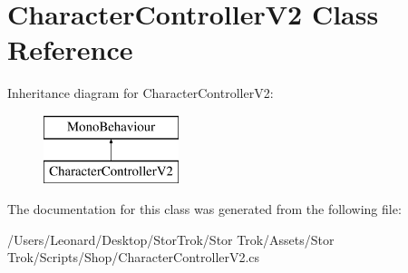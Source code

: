 \hypertarget{class_character_controller_v2}{}\section{Character\+Controller\+V2 Class Reference}
\label{class_character_controller_v2}
Inheritance diagram for Character\+Controller\+V2\+:\begin{figure}[H]
\begin{center}
\leavevmode
\includegraphics[height=2.000000cm]{class_character_controller_v2}
\end{center}
\end{figure}


The documentation for this class was generated from the following file\+:\begin{DoxyCompactItemize}
\item 
/\+Users/\+Leonard/\+Desktop/\+Stor\+Trok/\+Stor Trok/\+Assets/\+Stor Trok/\+Scripts/\+Shop/Character\+Controller\+V2.\+cs\end{DoxyCompactItemize}
